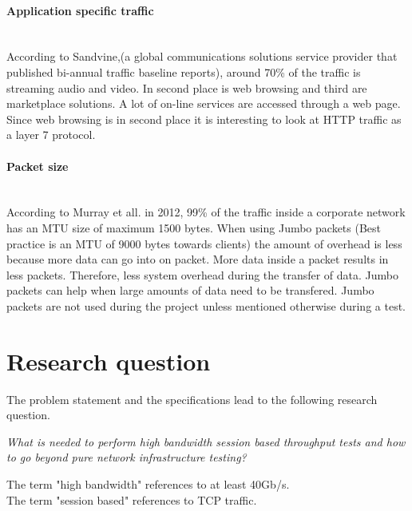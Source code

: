 \paragraph{Application specific traffic}\mbox{} \\
According to Sandvine\cite{phenomena_2017},(a global communications solutions service provider that published bi-annual traffic baseline reports), around 70\% of the traffic is streaming audio and video. In second place is web browsing and third are marketplace solutions. A lot of on-line services are accessed through a web page. 
Since web browsing is in second place it is interesting to look at HTTP traffic as a layer 7 protocol. 

\paragraph{Packet size}\label{par:packetsize}\mbox{}\\
According to Murray et all. \cite{murray2012state}  in 2012, 99\% of the traffic inside a corporate network has an MTU size of maximum 1500 bytes. When using Jumbo packets\cite{alliance_2017} (Best practice is an MTU of 9000 bytes towards clients\cite{jet}) the amount of overhead is less because more data can go into on packet. 
More data inside a packet results in less packets. Therefore, less system overhead during the transfer of data. 
Jumbo packets can help when large amounts of data need to be transfered.  
Jumbo packets are not used during the project unless mentioned otherwise during a test.

\newpage
\section{Research question}\label{sec:researchquestion}
The problem statement and the specifications lead to the following research question.

\begin{center}
\textit{What is needed to perform high bandwidth session based throughput tests and how to go beyond pure network infrastructure testing?} \\
\end{center}
The term "high bandwidth" references to at least 40Gb/s. \\
The term "session based" references to TCP traffic. \\

